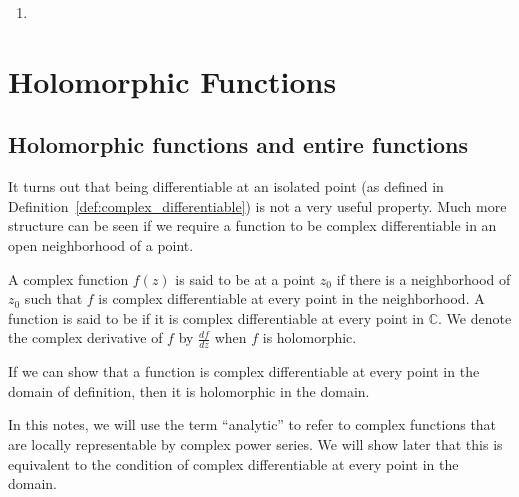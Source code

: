 \begin{enumerate}
	\item 

	
	
\end{enumerate}







\chapter{Holomorphic Functions}



\section{Holomorphic functions and entire functions}


It turns out that being differentiable at an isolated point (as defined in Definition~\ref{def:complex_differentiable}) is not a very useful property. Much more structure can be seen if we require a function to be complex differentiable in an open neighborhood of a point. 

\begin{svgraybox}
	\begin{definition}   \label{def:holomorphic_function}
		A complex function $f(z)$ is said to be  at a point $z_0$ if there is a neighborhood of $z_0$ such that $f$ is complex differentiable at every point in the neighborhood. A function is said to be  if it is complex differentiable at every point in $\mathbb{C}$. We denote the complex derivative of $f$ by $\frac{df}{dz}$ when $f$ is holomorphic.
	\end{definition}
\end{svgraybox}

If we can show that  a function is complex differentiable at every point in the domain of definition, then it is holomorphic in the domain.

\begin{remark}
	In this notes, we will use the term ``analytic'' to refer to complex functions that are locally representable by complex power series. We will show later that this is equivalent to the condition of complex differentiable at every point in the domain.
\end{remark}

